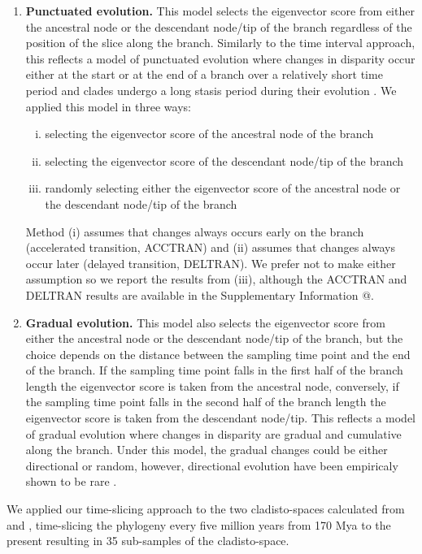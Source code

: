 \documentclass[12pt,letterpaper]{article}
\begin{document}
\begin{enumerate}
    \item{\textbf{Punctuated evolution.}} 
    This model selects the eigenvector score from either the ancestral node or the descendant node/tip of the branch regardless of the position of the slice along the branch. 
    Similarly to the time interval approach, this reflects a model of punctuated evolution where changes in disparity occur either at the start or at the end of a branch over a relatively short time period and clades undergo a long stasis period during their evolution \citep{Gould1977,Hunt20112007}.
    We applied this model in three ways: 
    \begin{enumerate}[(i)]
      \item selecting the eigenvector score of the ancestral node of the branch
      \item selecting the eigenvector score of the descendant node/tip of the branch
      \item randomly selecting either the eigenvector score of the ancestral node or the descendant node/tip of the branch
    \end{enumerate}
    Method (i) assumes that changes always occurs early on the branch (accelerated transition, ACCTRAN) and (ii) assumes that changes always occur later (delayed transition, DELTRAN).
    We prefer not to make either assumption so we report the results from (iii), although the ACCTRAN and DELTRAN results are available in the Supplementary Information @. %
    \item{\textbf{Gradual evolution.}}
    This model also selects the eigenvector score from either the ancestral node or the descendant node/tip of the branch, but the choice depends on the distance between the sampling time point and the end of the branch.
    If the sampling time point falls in the first half of the branch length the eigenvector score is taken from the ancestral node, conversely, if the sampling time point falls in the second half of the branch length the eigenvector score is taken from the descendant node/tip.
    This reflects a model of gradual evolution where changes in disparity are gradual and cumulative along the branch.
    Under this model, the gradual changes could be either directional or random, however, directional evolution have been empiricaly shown to be rare \citep[only 5\% of the time][]{Hunt20112007}.
\end{enumerate}
We applied our time-slicing approach to the two cladisto-spaces calculated from \cite{Slater2012MEE} and \cite{beckancient2014}, time-slicing the phylogeny every five million years from 170 Mya to the present resulting in 35 sub-samples of the cladisto-space. %
\end{document}
